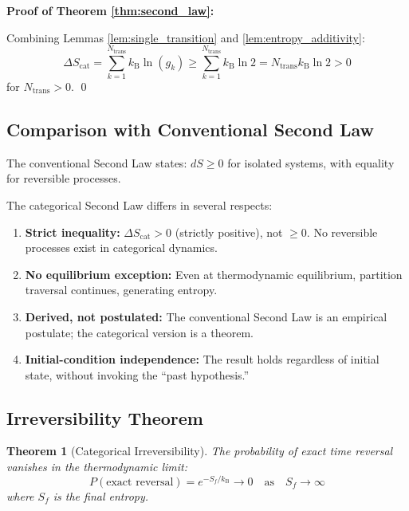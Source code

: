 \documentclass[twocolumn,10pt,twoside]{article}
\newtheorem{theorem}{Theorem}[section]
\newcommand{\kb}{k_{\mathrm{B}}}
\newcommand{\Scat}{S_{\mathrm{cat}}}
\begin{document}
\textbf{Proof of Theorem \ref{thm:second_law}:}

Combining Lemmas \ref{lem:single_transition} and \ref{lem:entropy_additivity}:
\begin{equation}
\Delta \Scat = \sum_{k=1}^{N_{\text{trans}}} \kb \ln(g_k) \geq \sum_{k=1}^{N_{\text{trans}}} \kb \ln 2 = N_{\text{trans}} \kb \ln 2 > 0
\end{equation}
for $N_{\text{trans}} > 0$. \qed

\subsection{Comparison with Conventional Second Law}

The conventional Second Law states: $dS \geq 0$ for isolated systems, with equality for reversible processes.

The categorical Second Law differs in several respects:

\begin{enumerate}
    \item \textbf{Strict inequality:} $\Delta \Scat > 0$ (strictly positive), not $\geq 0$. No reversible processes exist in categorical dynamics.

    \item \textbf{No equilibrium exception:} Even at thermodynamic equilibrium, partition traversal continues, generating entropy.

    \item \textbf{Derived, not postulated:} The conventional Second Law is an empirical postulate; the categorical version is a theorem.

    \item \textbf{Initial-condition independence:} The result holds regardless of initial state, without invoking the ``past hypothesis.''
\end{enumerate}

\subsection{Irreversibility Theorem}

\begin{theorem}[Categorical Irreversibility]
\label{thm:irreversibility}
The probability of exact time reversal vanishes in the thermodynamic limit:
\begin{equation}
P(\text{exact reversal}) = e^{-S_f/\kb} \to 0 \quad \text{as} \quad S_f \to \infty
\label{eq:irreversibility}
\end{equation}
where $S_f$ is the final entropy.
\end{theorem}
\end{document}
